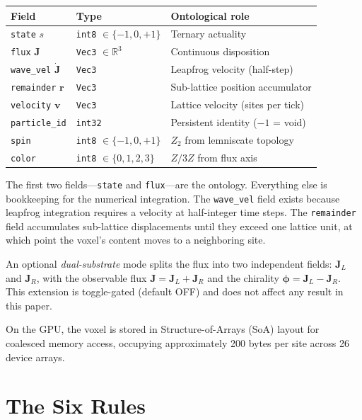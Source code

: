 \documentclass[11pt,a4paper]{article}
\newcommand{\RR}{\mathbb{R}}
\theoremstyle{compact}
\begin{document}
\begin{center}
\small
\begin{tabular}{lll}
\toprule
\textbf{Field} & \textbf{Type} & \textbf{Ontological role} \\
\midrule
\texttt{state} $s$ & \texttt{int8} $\in \{-1,0,+1\}$ & Ternary actuality \\
\texttt{flux} $\mathbf{J}$ & \texttt{Vec3} $\in \RR^3$ & Continuous disposition \\
\texttt{wave\_vel} $\dot{\mathbf{J}}$ & \texttt{Vec3} & Leapfrog velocity (half-step) \\
\texttt{remainder} $\mathbf{r}$ & \texttt{Vec3} & Sub-lattice position accumulator \\
\texttt{velocity} $\mathbf{v}$ & \texttt{Vec3} & Lattice velocity (sites per tick) \\
\texttt{particle\_id} & \texttt{int32} & Persistent identity ($-1$ = void) \\
\texttt{spin} & \texttt{int8} $\in \{-1,0,+1\}$ & $Z_2$ from lemniscate topology \\
\texttt{color} & \texttt{int8} $\in \{0,1,2,3\}$ & $Z/3Z$ from flux axis \\
\bottomrule
\end{tabular}
\end{center}

The first two fields---\texttt{state} and \texttt{flux}---are the ontology. Everything else is bookkeeping for the numerical integration. The \texttt{wave\_vel} field exists because leapfrog integration requires a velocity at half-integer time steps. The \texttt{remainder} field accumulates sub-lattice displacements until they exceed one lattice unit, at which point the voxel's content moves to a neighboring site.

An optional \emph{dual-substrate} mode splits the flux into two independent fields: $\mathbf{J}_L$ and $\mathbf{J}_R$, with the observable flux $\mathbf{J} = \mathbf{J}_L + \mathbf{J}_R$ and the chirality $\boldsymbol{\phi} = \mathbf{J}_L - \mathbf{J}_R$. This extension is toggle-gated (default OFF) and does not affect any result in this paper.

On the GPU, the voxel is stored in Structure-of-Arrays (SoA) layout for coalesced memory access, occupying approximately 200 bytes per site across 26 device arrays.


\section{The Six Rules}
\label{sec:rules}
\end{document}

